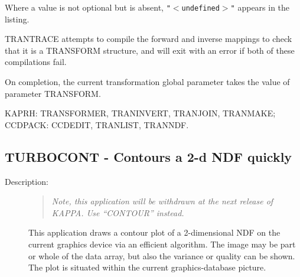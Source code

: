 \documentclass[twoside,11pt]{article}
\newcommand{\stardocinitials}  {SUN}
\newcommand{\stardocnumber}    {239.2}
\newcommand{\stardocname}{\stardocinitials /\stardocnumber}
\newcommand{\xlabel}[1]{}
\newlength{\sstbannerlength}
\newlength{\sstcaptionlength}
\newlength{\sstexampleslength}
\newlength{\sstexampleswidth}
\newcommand{\sstroutine}[3]{
   \goodbreak
   \markboth{{\stardocname}~ --- #1}{{\stardocname}~ --- #1}
   \rule{\textwidth}{0.5mm}
   \vspace{-7ex}
   \newline
   \settowidth{\sstbannerlength}{{\Large {\bf #1}}}
   \setlength{\sstcaptionlength}{\textwidth}
   \setlength{\sstexampleslength}{\textwidth}
   \addtolength{\sstbannerlength}{0.5em}
   \addtolength{\sstcaptionlength}{-2.0\sstbannerlength}
   \addtolength{\sstcaptionlength}{-4.9pt}
   \settowidth{\sstexampleswidth}{{\bf Examples:}}
   \addtolength{\sstexampleslength}{-\sstexampleswidth}
   \parbox[t]{\sstbannerlength}{\flushleft{\Large {\bf #1}}}
   \parbox[t]{\sstcaptionlength}{\center{\Large #2}}
   \parbox[t]{\sstbannerlength}{\flushright{\Large {\bf #1}}}
   \begin{description}
      #3
   \end{description}
}
\newcommand{\sstdescription}[1]{\item[Description:] #1}
\newcommand{\sstdiytopic}[2]{\goodbreak \item[{\hspace{-0.35em}#1\hspace{-0.35em}:}] \mbox{} \\[1.3ex] #2}
\newcommand{\sstitem}{\item}
\renewcommand{\sstroutine}[3]{
      \subsection{#1\xlabel{#1}-\label{#1}#2}
      \begin{description}
         #3
      \end{description}
   }
\renewcommand{\sstdescription}[1]{\item[Description:]
      \begin{description}
         #1
      \end{description}
   }
\renewcommand{\sstdiytopic}[2]{\item[{#1}]
      \begin{description}
         #2
      \end{description}
   }
\begin{document}
{{{         \sstitem
         Where a value is not optional but is absent, {\tt "$<$undefined$>$"} appears
         in the listing.

         \sstitem
         TRANTRACE attempts to compile the forward and inverse mappings
         to check that it is a TRANSFORM structure, and will exit with an
         error if both of these compilations fail.

         \sstitem
         On completion, the current transformation global parameter
         takes the value of parameter TRANSFORM.
      }
   }
   \sstdiytopic{
      Related Applications
   }{
      KAPRH: TRANSFORMER, TRANINVERT, TRANJOIN, TRANMAKE;
      CCDPACK: CCDEDIT, TRANLIST, TRANNDF.
   }
}

\sstroutine{
   TURBOCONT
}{
   Contours a 2-d NDF quickly
}{
   \sstdescription{

\vspace{5mm}
\begin{quote}
\begin{center}
\emph{ Note, this application will be withdrawn at the next release of
KAPPA. Use ``CONTOUR'' instead.} 
\end{center}
\end{quote}
\vspace{5mm}

      This application draws a contour plot of a 2-dimensional NDF on the
      current graphics device via an efficient algorithm.  The image may be
      part or whole of the data array, but also the variance or quality
      can be shown.  The plot is situated within the current
      graphics-database picture.

}}
\end{document}
